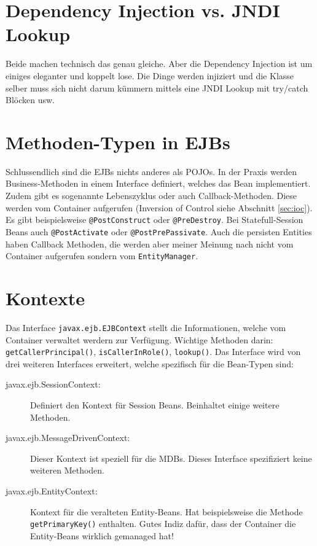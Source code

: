 \section{Dependency Injection vs. JNDI Lookup}
Beide machen technisch das genau gleiche. Aber die Dependency Injection ist um einiges eleganter und koppelt lose. Die Dinge werden injiziert und die Klasse selber muss sich nicht darum kümmern mittels eine JNDI Lookup mit try/catch Blöcken usw.

\section{Methoden-Typen in EJBs}
Schlussendlich sind die EJBs nichts anderes als POJOs. In der Praxis werden Business-Methoden in einem Interface definiert, welches das Bean implementiert. Zudem gibt es sogenannte Lebenszyklus oder auch Callback-Methoden. Diese werden vom Container aufgerufen (Inversion of Control siehe Abschnitt \ref{sec:ioc}). Es gibt beispielsweise \verb|@PostConstruct| oder \verb|@PreDestroy|. Bei Statefull-Session Beans auch \verb|@PostActivate| oder \verb|@PostPrePassivate|. Auch die persisten Entities haben Callback Methoden, die werden aber meiner Meinung nach nicht vom Container aufgerufen sondern vom \verb|EntityManager|.

\section{Kontexte}
Das Interface \verb|javax.ejb.EJBContext| stellt die Informationen, welche vom Container verwaltet werdern zur Verfügung. Wichtige Methoden darin: \verb|getCallerPrincipal()|, \verb|isCallerInRole()|, \verb|lookup()|. Das Interface wird von drei weiteren Interfaces erweitert, welche spezifisch für die Bean-Typen sind:
\begin{description}
	\item[javax.ejb.SessionContext:] Definiert den Kontext für Session Beans. Beinhaltet einige weitere Methoden.
	
	\item[javax.ejb.MessageDrivenContext:] Dieser Kontext ist speziell für die MDBs. Dieses Interface spezifiziert keine weiteren Methoden.
	
	\item[javax.ejb.EntityContext:] Kontext für die veralteten Entity-Beans. Hat beispielsweise die Methode \verb|getPrimaryKey()| enthalten. Gutes Indiz dafür, dass der Container die Entity-Beans wirklich gemanaged hat!
\end{description}

